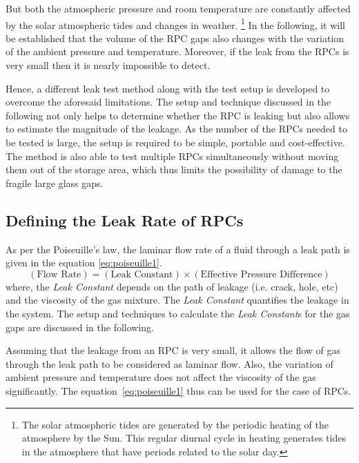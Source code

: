 But both the atmospheric pressure and room temperature are constantly
affected by the solar atmospheric tides and changes in weather.
\footnote{The solar atmospheric tides are generated by the periodic
  heating of the atmosphere by the Sun. This regular diurnal cycle in
  heating generates tides in the atmosphere that have periods related
  to the solar day.}
In the following, it will be established that the volume of the RPC
gaps also changes with the variation of the ambient pressure and
temperature. Moreover, if the leak from the RPCs is very small then it
is nearly impossible to detect.

Hence, a different leak test method along with the test setup is
developed to overcome the aforesaid limitations. The setup and
technique discussed in the following not only helps to determine
whether the RPC is leaking but also allows to estimate the
magnitude of the leakage. As the number of the RPCs needed to be tested
is large, the setup is required to be simple, portable and
cost-effective. The method is also able to test multiple RPCs
simultaneously without moving them out of the storage area, which thus
limits the possibility of damage to the fragile large glass gaps.

\subsection{Defining the Leak Rate of RPCs}
As per the Poiseuille's law\cite{poiseuille}, the laminar flow rate of a fluid
through a leak path is given in the equation \ref{eq:poiseuille1}.
\begin{equation}
\left(\text{Flow Rate}\right)=\left(\text{Leak Constant}\right)\times\left(\text{Effective Pressure Difference}\right)\label{eq:poiseuille1}
\end{equation}
where, the \textit{Leak Constant} depends on the path of leakage (i.e. crack,
hole, etc) and the viscosity of the gas mixture. The \textit{Leak Constant}
quantifies the leakage in the system. The setup and techniques to calculate
the \textit{Leak Constant}s for the gas gaps are discussed in the following.

Assuming that the leakage from an RPC is very small, it allows the flow of gas
through the leak path to be considered as laminar flow. Also, the variation of
ambient pressure and temperature does not affect the viscosity of the gas
significantly. The equation~\ref{eq:poiseuille1} thus can be used for the case
of RPCs.

